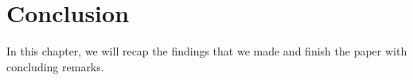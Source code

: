 
\section{Conclusion}
\label{cha:Conclusion}
In this chapter, we will recap the findings that we made and finish the paper with concluding remarks.

